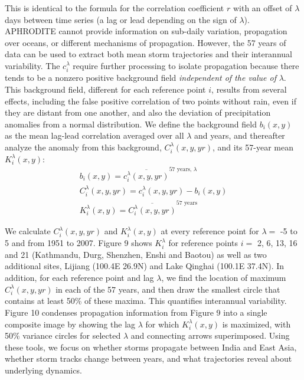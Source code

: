 \documentclass[12pt]{article}
\begin{document}
	 This is identical to the formula for the correlation coefficient $r$ with an offset of $\lambda$ days between time series (a lag or lead depending on the sign of $\lambda$). APHRODITE cannot provide information on sub-daily variation, propagation over oceans, or different mechanisms of propagation. However, the 57 years of data can be used to extract both mean storm trajectories and their interannual variability. The $c_i^\lambda$ require further processing to isolate propagation because there tends to be a nonzero positive background field \textit{independent of the value of} $\lambda$. This background field, different for each reference point $i$, results from several effects, including the false positive correlation of two points without rain, even if they are distant from one another, and also the deviation of precipitation anomalies from a normal distribution. We define the background field $b_i(x,y)$ as the mean lag-lead correlation averaged over all $\lambda$ and years, and thereafter analyze the anomaly from this background, $C_i^\lambda(x,y,yr)$, and its 57-year mean $K_i^\lambda(x,y)$:
\begin{align*}
	b_i(x,y)=\overline{c_i^\lambda(x,y,yr)}^{57\text{ years, }\lambda} \\
	C_i^\lambda(x,y,yr)=c_i^\lambda(x,y,yr)-b_i(x,y) \\
	K_i^\lambda(x,y)=\overline{C_i^\lambda(x,y,yr)}^{57\text{ years}}
\end{align*}
		
	We calculate $C_i^\lambda(x,y,yr)$ and $K_i^\lambda(x,y)$ at every reference point for $\lambda =$ -5 to 5 and from 1951 to 2007. Figure 9 shows $K_i^\lambda$ for reference points $i=$ 2, 6, 13, 16 and 21 (Kathmandu, Durg, Shenzhen, Enshi and Baotou) as well as two additional sites, Lijiang (100.4\textdegree E 26.9\textdegree N) and Lake Qinghai (100.1\textdegree E 37.4\textdegree N). In addition, for each reference point and lag $\lambda$, we find the location of maximum $C_i^\lambda(x,y,yr)$ in each of the 57 years, and then draw the smallest circle that contains at least 50\% of these maxima. This quantifies interannual variability. Figure 10 condenses propagation information from Figure 9 into a single composite image by showing the lag $\lambda$ for which $K_i^\lambda(x,y)$ is maximized, with 50\% variance circles for selected $\lambda$ and connecting arrows superimposed. Using these tools, we focus on whether storms propagate between India and East Asia, whether storm tracks change between years, and what trajectories reveal about underlying dynamics.
	
\end{document}
